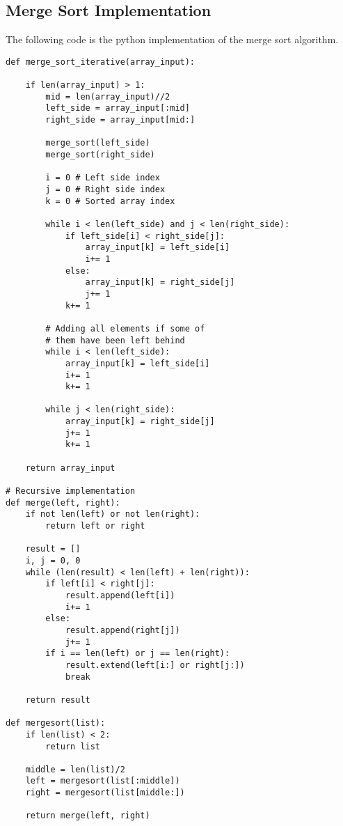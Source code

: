 \subsection{Merge Sort Implementation}
The following code is the python implementation of the merge sort algorithm.
\begin{lstlisting}[firstnumber=1, caption={Merge Sort python implementation (the recursive part is taken from \href{https://www.geeksforgeeks.org/iterative-merge-sort/}{Merge Sort, GeeksforGeeks}).}]
def merge_sort_iterative(array_input):
	
	if len(array_input) > 1:
		mid = len(array_input)//2
		left_side = array_input[:mid]
		right_side = array_input[mid:]
		
		merge_sort(left_side)
		merge_sort(right_side)
		
		i = 0 # Left side index
		j = 0 # Right side index
		k = 0 # Sorted array index
		
		while i < len(left_side) and j < len(right_side):
			if left_side[i] < right_side[j]:
				array_input[k] = left_side[i]
				i+= 1
			else:
				array_input[k] = right_side[j]
				j+= 1
			k+= 1
			
		# Adding all elements if some of 
        # them have been left behind 
        while i < len(left_side): 
        	array_input[k] = left_side[i] 
            i+= 1
            k+= 1
            
        while j < len(right_side): 
        	array_input[k] = right_side[j] 
            j+= 1
            k+= 1
			
	return array_input
	
# Recursive implementation
def merge(left, right):
    if not len(left) or not len(right):
        return left or right
 
    result = []
    i, j = 0, 0
    while (len(result) < len(left) + len(right)):
        if left[i] < right[j]:
            result.append(left[i])
            i+= 1
        else:
            result.append(right[j])
            j+= 1
        if i == len(left) or j == len(right):
            result.extend(left[i:] or right[j:])
            break
 
    return result
 
def mergesort(list):
    if len(list) < 2:
        return list
 
    middle = len(list)/2
    left = mergesort(list[:middle])
    right = mergesort(list[middle:])
 
    return merge(left, right)
\end{lstlisting}

